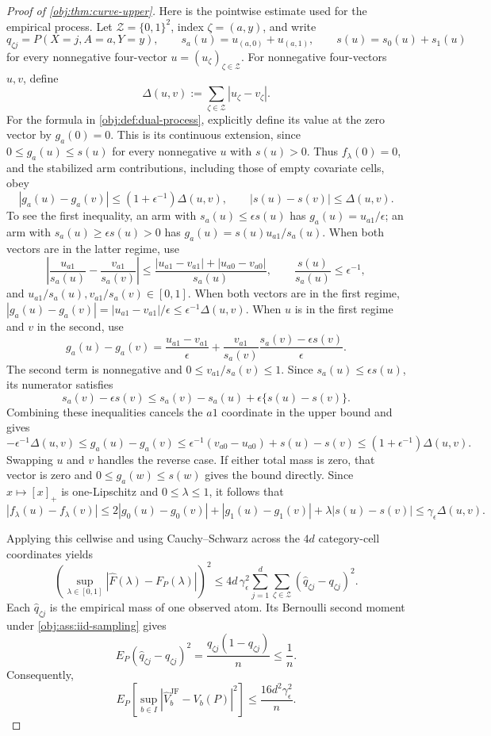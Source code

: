 \begin{proof}[Proof of \cref{obj:thm:curve-upper}]
Here is the pointwise estimate used for the empirical process. Let \(\mathcal Z=\{0,1\}^2\), index \(\zeta=(a,y)\), and write
\[
q_{\zeta j}=P(X=j,A=a,Y=y),\qquad
s_a(u)=u_{(a,0)}+u_{(a,1)},\qquad
s(u)=s_0(u)+s_1(u)
\]
for every nonnegative four-vector \(u=(u_\zeta)_{\zeta\in\mathcal Z}\). For nonnegative four-vectors \(u,v\), define
\[
\Delta(u,v):=\sum_{\zeta\in\mathcal Z}|u_\zeta-v_\zeta|.
\]
For the formula in \cref{obj:def:dual-process}, explicitly define its value at the zero vector by \(g_a(0)=0\). This is its continuous extension, since \(0\le g_a(u)\le s(u)\) for every nonnegative \(u\) with \(s(u)>0\). Thus \(f_\lambda(0)=0\), and the stabilized arm contributions, including those of empty covariate cells, obey
\[
|g_a(u)-g_a(v)|\le(1+\epsilon^{-1})\Delta(u,v),
\qquad
|s(u)-s(v)|\le\Delta(u,v).
\]
To see the first inequality, an arm with \(s_a(u)\le\epsilon s(u)\) has \(g_a(u)=u_{a1}/\epsilon\); an arm with \(s_a(u)\ge\epsilon s(u)>0\) has \(g_a(u)=s(u)u_{a1}/s_a(u)\). When both vectors are in the latter regime, use
\[
\left|\frac{u_{a1}}{s_a(u)}-\frac{v_{a1}}{s_a(v)}\right|
\le
\frac{|u_{a1}-v_{a1}|+|u_{a0}-v_{a0}|}{s_a(u)},
\qquad
\frac{s(u)}{s_a(u)}\le\epsilon^{-1},
\]
and \(u_{a1}/s_a(u),v_{a1}/s_a(v)\in[0,1]\). When both vectors are in the first regime, \(|g_a(u)-g_a(v)|=|u_{a1}-v_{a1}|/\epsilon\le\epsilon^{-1}\Delta(u,v)\). When \(u\) is in the first regime and \(v\) in the second, use
\[
g_a(u)-g_a(v)
=
\frac{u_{a1}-v_{a1}}{\epsilon}
+
\frac{v_{a1}}{s_a(v)}
 \frac{s_a(v)-\epsilon s(v)}{\epsilon}.
\]
The second term is nonnegative and \(0\le v_{a1}/s_a(v)\le1\). Since \(s_a(u)\le\epsilon s(u)\), its numerator satisfies
\[
s_a(v)-\epsilon s(v)
\le s_a(v)-s_a(u)+\epsilon\{s(u)-s(v)\}.
\]
Combining these inequalities cancels the \(a1\) coordinate in the upper bound and gives
\[
-\epsilon^{-1}\Delta(u,v)
\le g_a(u)-g_a(v)
\le \epsilon^{-1}(v_{a0}-u_{a0})+s(u)-s(v)
\le(1+\epsilon^{-1})\Delta(u,v).
\]
Swapping \(u\) and \(v\) handles the reverse case. If either total mass is zero, that vector is zero and \(0\le g_a(w)\le s(w)\) gives the bound directly. Since \(x\mapsto[x]_+\) is one-Lipschitz and \(0\le\lambda\le1\), it follows that
\[
|f_\lambda(u)-f_\lambda(v)|
\le
2|g_0(u)-g_0(v)|+|g_1(u)-g_1(v)|
 +\lambda|s(u)-s(v)|
\le\gamma_\epsilon\Delta(u,v).
\]

Applying this cellwise and using Cauchy--Schwarz across the \(4d\) category-cell coordinates yields
\[
\left(\sup_{\lambda\in[0,1]}
 |\widehat F(\lambda)-F_P(\lambda)|\right)^2
\le
4d\,\gamma_\epsilon^2
\sum_{j=1}^d\sum_{\zeta\in\mathcal Z}
 (\widehat q_{\zeta j}-q_{\zeta j})^2.
\]
Each \(\widehat q_{\zeta j}\) is the empirical mass of one observed atom. Its Bernoulli second moment under \cref{obj:ass:iid-sampling} gives
\[
E_P(\widehat q_{\zeta j}-q_{\zeta j})^2
=\frac{q_{\zeta j}(1-q_{\zeta j})}{n}\le\frac1n.
\]
Consequently,
\[
E_P\!\left[\sup_{b\in I}
 |\widehat V_b^{\mathrm{JF}}-V_b(P)|^2\right]
\le
\frac{16d^2\gamma_\epsilon^2}{n}.
\]


\end{proof}
